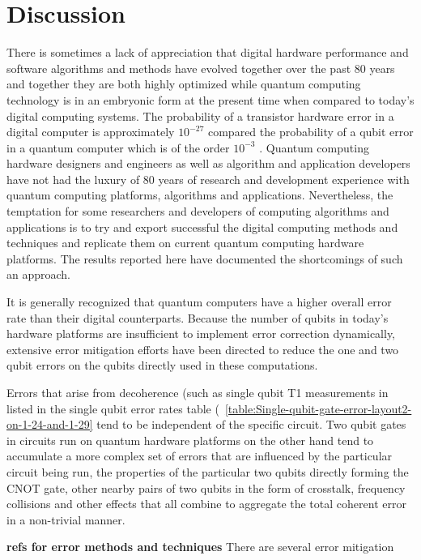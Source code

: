 
\section{Discussion}
\label{sec:discussion}




There is sometimes a lack of appreciation that digital hardware performance and software algorithms and methods have evolved together over the past 80 years and together they are both highly optimized while quantum computing technology is in an embryonic form at the present time when compared to today's digital computing systems.  The probability of a transistor hardware error in a digital computer is approximately $10^{-27}$ compared the probability of a qubit error in a quantum computer which is of the order $10^{-3}$ \cite{1028924}.   Quantum computing hardware designers and engineers as well as algorithm and application developers have not had the luxury of 80 years of research and development experience with quantum computing platforms, algorithms and applications. Nevertheless, the temptation for some researchers and developers of computing algorithms and applications is to try and export  successful the digital computing methods and techniques and replicate them on current quantum computing hardware platforms.  The results reported here have documented the shortcomings of such an approach.

It is generally recognized that quantum computers have a higher overall error rate than their digital counterparts.  Because the number of qubits in today's hardware platforms are insufficient to implement error correction dynamically, extensive error mitigation efforts have been directed to reduce the one and two qubit errors on the qubits directly used in these computations. 

Errors that arise from decoherence (such as single qubit T1 measurements in listed in the single qubit error rates table (~\ref{table:Single-qubit-gate-error-layout2-on-1-24-and-1-29} tend to be independent of the specific circuit.  Two qubit gates in circuits run on quantum hardware platforms on the other hand tend to accumulate a more complex set of errors that are influenced by the particular circuit being run, the properties of the particular two qubits directly forming the CNOT gate, other nearby pairs of two qubits in the form of crosstalk, frequency collisions and other effects that all combine to aggregate the total coherent error in a non-trivial manner.  

\textbf{refs for error methods and techniques}
There are several error mitigation 

